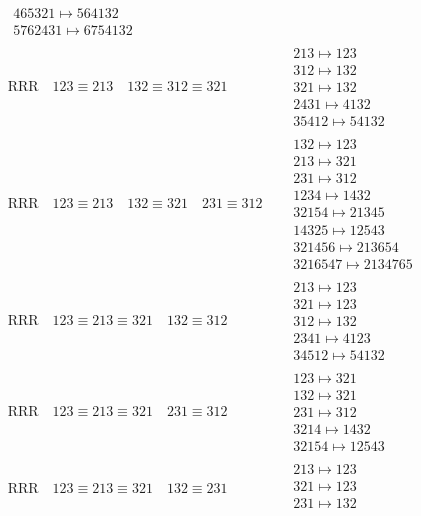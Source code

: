 \documentclass{article}
\begin{document}
\begin{align}
\begin{matrix}
\\
465321 \mapsto 564132
\\
5762431 \mapsto 6754132
\end{matrix}
\\
\text{RRR}
\quad
123\equiv213
\quad
132\equiv312\equiv321
\quad
&
\begin{matrix}
213 \mapsto 123
\\
312 \mapsto 132
\\
321 \mapsto 132
\\
2431 \mapsto 4132
\\
35412 \mapsto 54132
\end{matrix}
\\
\text{RRR}
\quad
123\equiv213
\quad
132\equiv321
\quad
231\equiv312
\quad
&
\begin{matrix}
132 \mapsto 123
\\
213 \mapsto 321
\\
231 \mapsto 312
\\
1234 \mapsto 1432
\\
32154 \mapsto 21345
\\
14325 \mapsto 12543
\\
321456 \mapsto 213654
\\
3216547 \mapsto 2134765
\end{matrix}
\\
\text{RRR}
\quad
123\equiv213\equiv321
\quad
132\equiv312
\quad
&
\begin{matrix}
213 \mapsto 123
\\
321 \mapsto 123
\\
312 \mapsto 132
\\
2341 \mapsto 4123
\\
34512 \mapsto 54132
\end{matrix}
\\
\text{RRR}
\quad
123\equiv213\equiv321
\quad
231\equiv312
\quad
&
\begin{matrix}
123 \mapsto 321
\\
132 \mapsto 321
\\
231 \mapsto 312
\\
3214 \mapsto 1432
\\
32154 \mapsto 12543
\end{matrix}
\\
\text{RRR}
\quad
123\equiv213\equiv321
\quad
132\equiv231
\quad
&
\begin{matrix}
213 \mapsto 123
\\
321 \mapsto 123
\\
231 \mapsto 132
\\

\end{matrix}
\end{align}
\end{document}
